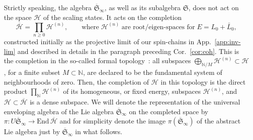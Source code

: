 \documentclass[11pt]{article}
\newcommand{\Hilb}{\mathcal{H}}
\newcommand{\cHilb}{\overline{\Hilb}}
\newcommand{\oN}{\mathbb{N}}
\newcommand{\Endo}{\mathrm{End}}
\newcommand{\interLie}{\mathfrak{S}}
\newcommand{\interch}{\interLie}
\newcommand{\interinfinco}{\overline{\interLie}_{\infty}}
\newcommand{\rep}{\pi}
\theoremstyle{definition}
\begin{document}
Strictly speaking, the algebra $\interinfinco$, as well as its subalgebra $\interch$,  does not act on the space $\Hilb$ of the scaling states. It acts
on the completion
\begin{equation}\label{eq:cHilb}
\cHilb=\prod_{n\geq0} \Hilb^{(n)},\qquad
 \text{where}\; \Hilb^{(n)} \;\text{are root/eigen-spaces for}\; E=L_0+\bar{L}_0,
\end{equation}
 constructed initially as the projective limit of our spin-chains in App.~\ref{app:inv-lim} and described in details in the paragraph preceding Cor.~\ref{cor:coh}.
This is the completion in the so-called formal topology~\cite{Kac-book}: all subspaces $\bigoplus_{\oN/M}\Hilb^{(n)}\subset\Hilb$, for a finite subset $M\subset\oN$, are declared to be the fundamental system of neighbourhoods of zero. Then, the completion of $\Hilb$ in this  topology is the direct product $\prod_{\oN}\Hilb^{(n)}$ of its homogeneous, or fixed energy, subspaces $\Hilb^{(n)}$, and $\Hilb\subset\cHilb$ is a dense subspace.
We will denote the representation of the universal enveloping algebra  of the Lie algebra $\interinfinco$ on the completed space by $\rep :U\interinfinco \to \Endo\,\cHilb$ and for simplicity  denote the image $\rep(\interinfinco)$ of the abstract Lie algebra just by $\interinfinco$ in what follows.
\end{document}
